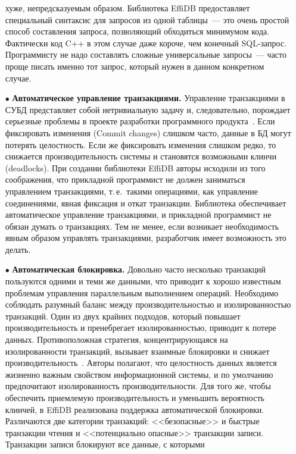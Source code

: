 \begin{multicols}{2}
\begin{itemize}
хуже, непредсказуемым образом. Биб\-лио\-те\-ка EffiDB предоставляет специальный 
синтаксис для запросов из одной таблицы~--- это очень простой способ составления 
запроса, позволяющий обходиться минимумом кода. Фактически код C++ в этом 
случае даже короче, чем конечный SQL-за\-прос. Программисту не надо составлять 
сложные универсальные запросы~--- часто проще писать именно тот запрос, который 
нужен в данном конкретном случае.
\item[$\bullet$] \textbf{Автоматическое управление транзакциями.} Управление 
транзакциями в СУБД представляет собой нетривиальную задачу и, следовательно, 
порождает серьезные проблемы в проекте разработки программного 
продукта~\cite{4-y, 3-y}. Если фиксировать изменения (Commit changes) слишком 
часто, данные в БД могут потерять целостность. Если же фиксировать изменения 
слишком редко, то снижается производительность системы и становятся возможными 
клинчи (deadlocks). При создании библиотеки EffiDB авторы исходили из того 
соображения, что прикладной программист не должен заниматься управлением 
транзакциями, т.\,е.\ такими операциями, как управление соединениями, явная 
фиксация и откат транзакции. Библиотека обеспечивает автоматическое управление 
транзакциями, и прикладной программист не обязан думать о транзакциях. Тем не 
менее, если возникает необходимость явным образом управлять транзакциями, 
разработчик имеет возможность это делать.
\item[$\bullet$] \textbf{Автоматическая блокировка.} Довольно часто несколько 
транзакций пользуются одними и теми же данными, что приводит к хорошо известным 
проблемам управления параллельным выполнением операций. Необходимо соблюдать 
разумный баланс между произво\-ди\-тель\-ностью и изолированностью транзакций. Один 
из двух крайних подходов, который повышает производительность и пренебрегает 
изолированностью, приводит к потере данных. Противоположная стратегия, 
концентрирующаяся на изолированности транзакций, вызывает\linebreak
 взаимные блокировки 
и снижает производительность~\cite{4-y}. Авторы полагают, что целостность данных 
является жизненно важным\linebreak
 свойством информационной системы, и по умолчанию 
предпочитают изолированность производительности. Для того же, чтобы обеспечить 
приемлемую производительность и уменьшить вероятность клинчей, в EffiDB 
реализована поддержка автоматической блокировки. Различаются две категории 
транзакций: <<безопасные>> и быстрые транзакции чтения и <<потенциально 
опасные>> транзакции записи. Транзакции записи блокируют все данные, с которыми 

\end{itemize}
\end{multicols}
